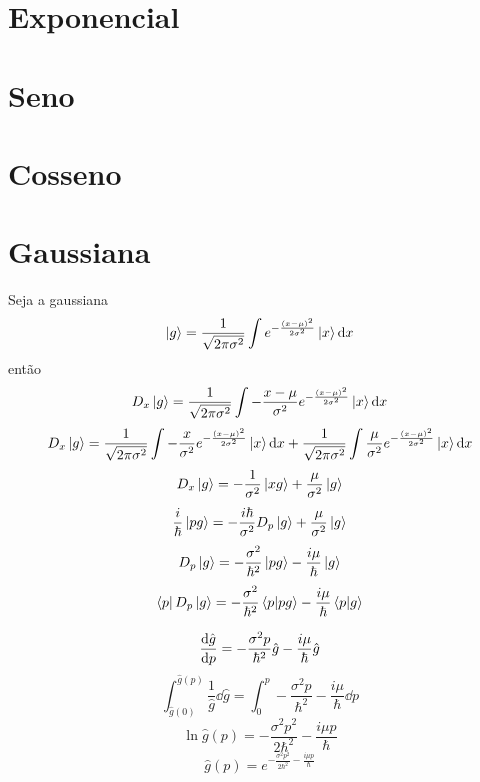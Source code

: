 \documentclass[report,14pt,openright,oneside,a4paper,brazil]{abntex2}
\newcommand{\abrir}[2]{\int{#1}\ket{#2}\dd{#2}}
\begin{document}
\section{Exponencial}

\section{Seno}

\section{Cosseno}

\section{Gaussiana}
Seja a gaussiana
\begin{equation}
    \ket{g}=\frac{1}{\sqrt{2\pi\sigma^2}} \abrir{e^{-\frac{(x-\mu)^2}{2\sigma^2}}}{x}
\end{equation}
então
\begin{equation}
    D_x\ket{g}=\frac{1}{\sqrt{2\pi\sigma^2}} \abrir{-\frac{x-\mu}{\sigma^2} e^{-\frac{(x-\mu)^2}{2\sigma^2}}}{x}
\end{equation}
\begin{equation}
    D_x\ket{g}=\frac{1}{\sqrt{2\pi\sigma^2}} \abrir{-\frac{x}{\sigma^2} e^{-\frac{(x-\mu)^2}{2\sigma^2}}}{x}+\frac{1}{\sqrt{2\pi\sigma^2}} \abrir{\frac{\mu}{\sigma^2} e^{-\frac{(x-\mu)^2}{2\sigma^2}}}{x}
\end{equation}
\begin{equation}
    D_x\ket{g}=-\frac{1}{\sigma^2}\ket{xg}+\frac{\mu}{\sigma^2}\ket{g}
\end{equation}
\begin{equation}
    \frac{i}{\hbar}\ket{pg}=-\frac{i\hbar}{\sigma^2}D_p\ket{g}+\frac{\mu}{\sigma^2}\ket{g}
\end{equation}
\begin{equation}
    D_p\ket{g}=-\frac{\sigma^2}{\hbar^2} \ket{pg}-\frac{i\mu}{\hbar} \ket{g}
\end{equation}
\begin{equation}
    \bra{p}D_p\ket{g}=-\frac{\sigma^2}{\hbar^2} \bra{p}\ket{pg}-\frac{i\mu}{\hbar} \bra{p}\ket{g}
\end{equation}

\begin{equation}
    \dv{\hat g}{p} = -\frac{\sigma^2p}{\hbar^2} \hat{g}-\frac{i\mu}{\hbar} \hat g
\end{equation}
\begin{equation}
    \int_{\hat{g}(0)}^{\hat{g}(p)} \frac{1}{\hat g} \dd{\hat g} = \int_0^p -\frac{\sigma^2p}{\hbar^2} -\frac{i\mu}{\hbar} \dd{p} 
\end{equation}
\begin{equation}
    \ln {\hat g(p)} = -\frac{\sigma^2p^2}{2\hbar^2} -\frac{i\mu p}{\hbar} 
\end{equation}
\begin{equation}
    \hat g(p) = e^{-\frac{\sigma^2p^2}{2\hbar^2} -\frac{i\mu p}{\hbar}} 
\end{equation}
\end{document}
